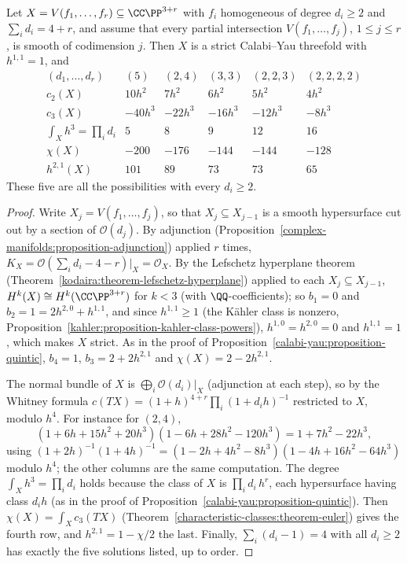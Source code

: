 \begin{proposition}\label{calabi-yau:proposition-complete-intersections}
Let $X = V(f_1, \ldots, f_r) \subseteq \CC\PP^{3+r}$ with $f_i$ homogeneous of degree $d_i \geq 2$ and $\sum_id_i = 4 + r$, and assume that every partial intersection $V(f_1, \ldots, f_j)$, $1 \leq j \leq r$, is smooth of
codimension $j$. Then $X$ is a strict Calabi--Yau threefold with $h^{1,1} = 1$, and
\[
\begin{array}{c|ccccc}
(d_1, \ldots, d_r) & (5) & (2, 4) & (3, 3) & (2, 2, 3) & (2, 2, 2, 2) \\ \hline
c_2(X) & 10h^2 & 7h^2 & 6h^2 & 5h^2 & 4h^2 \\
c_3(X) & -40h^3 & -22h^3 & -16h^3 & -12h^3 & -8h^3 \\
\int_Xh^3 = \prod_id_i & 5 & 8 & 9 & 12 & 16 \\
\chi(X) & -200 & -176 & -144 & -144 & -128 \\
h^{2,1}(X) & 101 & 89 & 73 & 73 & 65
\end{array}
\]
These five are all the possibilities with every $d_i \geq 2$.
\end{proposition}

\begin{proof}
Write $X_j = V(f_1, \ldots, f_j)$, so that $X_j \subseteq X_{j-1}$ is a smooth hypersurface cut out by a section of $\mathcal{O}(d_j)$. By adjunction (Proposition~\ref{complex-manifolds:proposition-adjunction}) applied
$r$ times, $K_X = \mathcal{O}(\sum_id_i - 4 - r)|_X = \mathcal{O}_X$. By the Lefschetz hyperplane theorem (Theorem~\ref{kodaira:theorem-lefschetz-hyperplane}) applied to each $X_j \subseteq X_{j-1}$, $H^k(X) \cong H^k(\CC\PP^{3+r})$
for $k < 3$ (with $\QQ$-coefficients); so $b_1 = 0$ and $b_2 = 1 = 2h^{2,0} + h^{1,1}$, and since $h^{1,1} \geq 1$ (the K\"ahler class is nonzero,
Proposition~\ref{kahler:proposition-kahler-class-powers}), $h^{1,0} = h^{2,0} = 0$ and $h^{1,1} = 1$, which makes $X$ strict. As in the proof of Proposition~\ref{calabi-yau:proposition-quintic}, $b_4 = 1$, $b_3 = 2 + 2h^{2,1}$ and
$\chi(X) = 2 - 2h^{2,1}$.

The normal bundle of $X$ is $\bigoplus_i\mathcal{O}(d_i)|_X$ (adjunction at each step), so by the Whitney formula $c(TX) = (1 + h)^{4+r}\prod_i(1 + d_ih)^{-1}$ restricted to $X$, modulo $h^4$. For instance for $(2, 4)$,
\[
(1 + 6h + 15h^2 + 20h^3)(1 - 6h + 28h^2 - 120h^3) = 1 + 7h^2 - 22h^3,
\]
using $(1 + 2h)^{-1}(1 + 4h)^{-1} = (1 - 2h + 4h^2 - 8h^3)(1 - 4h + 16h^2 - 64h^3)$ modulo $h^4$; the other columns are the same computation. The degree $\int_Xh^3 = \prod_id_i$ holds because the class of $X$ is
$\prod_id_i\,h^r$, each hypersurface having class $d_ih$ (as in the proof of Proposition~\ref{calabi-yau:proposition-quintic}). Then $\chi(X) = \int_Xc_3(TX)$ (Theorem~\ref{characteristic-classes:theorem-euler}) gives
the fourth row, and $h^{2,1} = 1 - \chi/2$ the last. Finally, $\sum_i(d_i - 1) = 4$ with all $d_i \geq 2$ has exactly the five solutions listed, up to order.
\end{proof}

